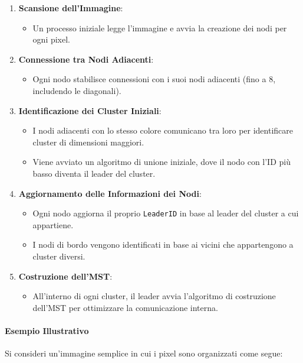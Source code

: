 \documentclass[12pt, a4paper]{report}
\begin{document}
\begin{enumerate}
    \item \textbf{Scansione dell'Immagine}:
    \begin{itemize}
        \item Un processo iniziale legge l'immagine e avvia la creazione dei nodi per ogni pixel.
    \end{itemize}
    \item \textbf{Connessione tra Nodi Adiacenti}:
    \begin{itemize}
        \item Ogni nodo stabilisce connessioni con i suoi nodi adiacenti (fino a 8, includendo le diagonali).
    \end{itemize}
    \item \textbf{Identificazione dei Cluster Iniziali}:
    \begin{itemize}
        \item I nodi adiacenti con lo stesso colore comunicano tra loro per identificare cluster di dimensioni maggiori.
        \item Viene avviato un algoritmo di unione iniziale, dove il nodo con l'ID più basso diventa il leader del cluster.
    \end{itemize}
    \item \textbf{Aggiornamento delle Informazioni dei Nodi}:
    \begin{itemize}
        \item Ogni nodo aggiorna il proprio \texttt{LeaderID} in base al leader del cluster a cui appartiene.
        \item I nodi di bordo vengono identificati in base ai vicini che appartengono a cluster diversi.
    \end{itemize}
    \item \textbf{Costruzione dell'MST}:
    \begin{itemize}
        \item All'interno di ogni cluster, il leader avvia l'algoritmo di costruzione dell'MST per ottimizzare la comunicazione interna.
    \end{itemize}
\end{enumerate}

\paragraph{Esempio Illustrativo}

Si consideri un'immagine semplice in cui i pixel sono organizzati come segue:
\end{document}
